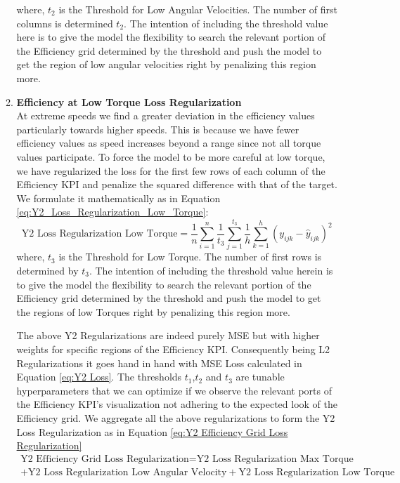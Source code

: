 \documentclass{report} %
\begin{document}
\begin{enumerate}
\begin{enumerate}
\begin{equation}
    \label{eq:Y2_Loss_Regularization_Low_Speed}
\end{equation}
where, \(t_{2}\) is the Threshold for Low Angular Velocities. The number of first columns is determined $t_{2}$. 
The intention of including the threshold value here is to give the model the flexibility to search the relevant portion of the Efficiency grid determined by the threshold 
and push the model to get the region of low angular velocities right by penalizing this region more.
\item \textbf{Efficiency at Low Torque Loss Regularization} \\
At extreme speeds we find a greater deviation in the efficiency values particularly towards higher speeds. This is because we have fewer efficiency values as speed 
increases beyond a range since not all torque values participate.
To force the model to be more careful at low torque, we have regularized the loss for the first few rows of each column of the Efficiency \ac{KPI} and penalize the 
squared difference with that of the target. 
We formulate it mathematically as in Equation \ref{eq:Y2_Loss_Regularization_Low_Torque}:
\begin{equation}
    \text{Y2 Loss Regularization Low Torque} = \frac{1}{n} \sum_{i=1}^{n} \frac{1}{t_{3}} \sum_{j=1}^{t_{3}} \frac{1}{h} \sum_{k=1}^{h} (y_{ijk} - \hat{y}_{ijk})^2
    \label{eq:Y2_Loss_Regularization_Low_Torque}
\end{equation}
where, \(t_{3}\) is the Threshold for Low Torque. The number of first rows is determined by $t_{3}$.
The intention of including the threshold value herein is to give the model the flexibility to search the relevant portion of the Efficiency grid determined by the threshold 
and push the model to get the regions of low Torques right by penalizing this region more.

The above Y2 Regularizations are indeed purely \ac{MSE} but with higher weights for specific regions of the Efficiency \ac{KPI}.
Consequently being L2 Regularizations it goes hand in hand with \ac{MSE} Loss calculated in Equation \ref{eq:Y2 Loss}.
The thresholds \(t_{1}\),\(t_{2}\) and \(t_{3}\) are tunable hyperparameters that we can optimize if we observe the relevant ports of the Efficiency \ac{KPI}'s visualization 
not adhering to the expected look of the Efficiency grid.
We aggregate all the above regularizations to form the Y2 Loss Regularization as in Equation \ref{eq:Y2 Efficiency Grid Loss Regularization}
\begin{equation}
    \begin{split}
    \text{Y2 Efficiency Grid Loss Regularization} = \text{Y2 Loss Regularization Max Torque} \\
    + \text{Y2 Loss Regularization Low Angular Velocity} + \text{Y2 Loss Regularization Low Torque}
    \end{split}
    \label{eq:Y2 Efficiency Grid Loss Regularization}
\end{equation}
\end{enumerate}
\end{enumerate}
\end{document}
